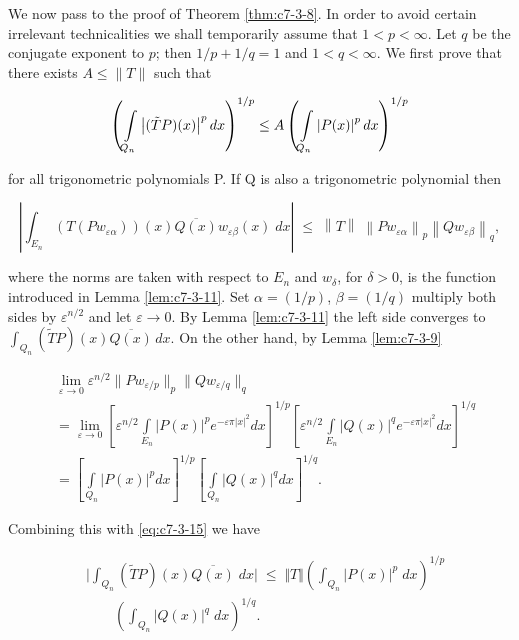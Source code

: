 We now pass to the proof of Theorem \ref{thm:c7-3-8}. In order to avoid certain irrelevant technicalities we shall temporarily assume that $1 < p < \infty$. Let $q$ be the conjugate exponent to $p$; then $1/p + 1/q = 1$ and $1 < q < \infty$. We first prove that there exists $A \leq \|T\|$ such that

\begin{equation}\label{eq:c7-3-14}
\left(\intop_{Q_{n}}\left|(\tilde{T}P)(x)\right|^{p}d x\right)^{1/p}\leq A\left(\intop_{Q_{n}}\left|P(x)\right|^{p}d x\right)^{1/p}
\end{equation}

for all trigonometric polynomials P. If Q is also a trigonometric polynomial then

\begin{equation}\label{eq:c7-3-15}
\left|\int_{E_{n}}{(T(P w_{\varepsilon\alpha}))(x)\overline{{Q(x)}}w_{\varepsilon\beta}(x)\;}d x\right|\;\leq\;\left\|T\right\|\;\left\|P w_{\varepsilon\alpha}\right\|_{p}\left\|Q w_{\varepsilon\beta}\right\|_{q},
\end{equation}

where the norms are taken with respect to $E_n$ and $w_\delta$, for $\delta > 0$, is the function introduced in Lemma \ref{lem:c7-3-11}. Set $\alpha = (1/p)$, $\beta = (1/q)$ multiply both sides by $\varepsilon^{n/2}$ and let $\varepsilon \to 0$. By Lemma \ref{lem:c7-3-11} the left side converges to $\int_{Q_n}(\tilde{T}P)(x)\overline{Q(x)}\,dx$. On the other hand, by Lemma \ref{lem:c7-3-9}

\[
\begin{aligned}&\lim_{\varepsilon\to0}\varepsilon^{n/2}\big\|P w_{\varepsilon/p}\big\|_{p}\big\|Q w_{\varepsilon/q}\big\|_{q}\\&=\lim_{\varepsilon\to0}\left[\varepsilon^{n/2}\int\limits_{E_{n}}\big|P(x)\big|^{p} e^{-\varepsilon\pi|x|^{2}}dx\right]^{1/p}\left[\varepsilon^{n/2}\int\limits_{E_{n}}\big|Q(x)\big|^{q} e^{-\varepsilon\pi|x|^{2}}dx\right]^{1/q}\\&=\left[\int\limits_{Q_{n}}\big|P(x)\big|^{p} dx\right]^{1/p}\left[\int\limits_{Q_{n}}\big|Q(x)\big|^{q} dx\right]^{1/q}.\end{aligned}
\]

Combining this with \eqref{eq:c7-3-15} we have

\[
\begin{aligned}&\bigg|\int_{Q_{n}}(\widetilde T P)(x)\overline{{Q(x)}}\;d x\bigg|\;\leq\;\Vert T\Vert\left(\int_{Q_{n}}\vert P(x)\vert^{p}\;d x\right)^{1/p}\\&\qquad\left(\int_{Q_{n}}\vert Q(x)\vert^{q}\;d x\right)^{1/q}.\end{aligned}
\]

